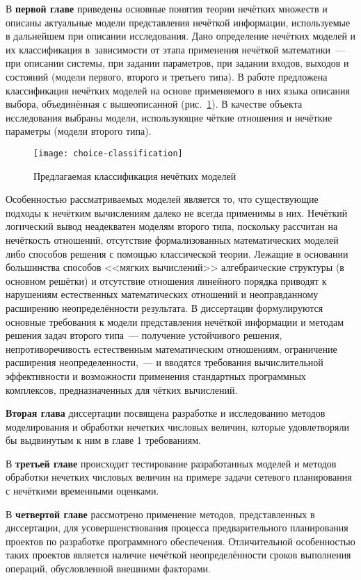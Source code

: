 В \textbf{первой главе} приведены основные понятия теории нечётких множеств и описаны актуальные модели представления нечёткой информации, используемые в дальнейшем при описании исследования. Дано определение нечётких моделей и их классификация в~зависимости от этапа применения нечёткой математики~--- при описании системы, при задании параметров, при задании входов, выходов и состояний (модели первого, второго и третьего типа). В работе предложена классификация нечётких моделей на основе применяемого в них языка описания выбора, объединённая с вышеописанной (рис.~\ref{fig:choice-classification}). В качестве объекта исследования выбраны модели, использующие чёткие отношения и нечёткие параметры (модели второго типа).
\begin{figure}[h] 
  \center
  \texttt{[image: choice-classification]}
  \caption{Предлагаемая классификация нечётких моделей} 
  \label{fig:choice-classification}
\end{figure}

Особенностью рассматриваемых моделей является то, что существующие подходы к нечётким вычислениям далеко не всегда применимы в них. Нечёткий логический вывод неадекватен моделям второго типа, поскольку рассчитан на нечёткость отношений, отсутствие формализованных математических моделей либо способов решения с помощью классической теории. Лежащие в основании большинства способов <<мягких вычислений>> алгебраические структуры (в основном решётки) и отсутствие отношения линейного порядка приводят к нарушениям естественных математических отношений и неоправданному расширению неопределённости результата. В диссертации формулируются основные требования к модели представления нечёткой информации и методам решения задач второго типа~--- получение устойчивого решения, непротиворечивость естественным математическим отношениям, ограничение расширения неопределенности,~--- и вводятся требования вычислительной эффективности и возможности применения стандартных программных комплексов, предназначенных для чётких вычислений.

\textbf{Вторая глава} диссертации посвящена разработке и исследованию методов моделирования и обработки нечетких числовых величин, которые удовлетворяли бы выдвинутым к ним в главе 1 требованиям. 

В \textbf{третьей главе} происходит тестирование разработанных моделей и методов обработки нечетких числовых величин на примере задачи сетевого планирования с нечёткими временными оценками.

В \textbf{четвертой главе} рассмотрено применение методов, представленных в диссертации, для усовершенствования процесса предварительного планирования проектов по разработке программного обеспечения. Отличительной особенностью таких проектов является наличие нечёткой неопределённости сроков выполнения операций, обусловленной внешними факторами. 

